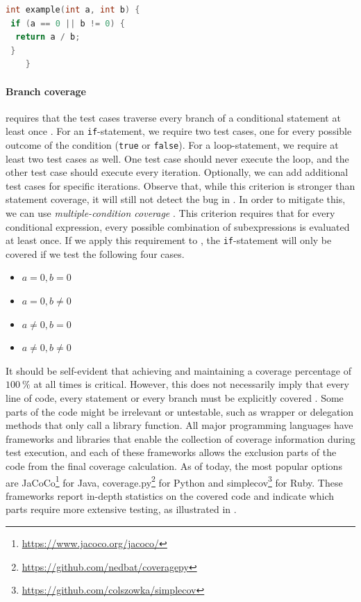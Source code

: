 \begin{lstlisting}[caption=Irrelevant statement coverage in C.,label=lst:statement-coverage-fail,language=C]
	int example(int a, int b) {
 if (a == 0 || b != 0) {
  return a / b;
 }
	}
\end{lstlisting}

\paragraph*{Branch coverage} requires that the test cases traverse every branch of a conditional statement at least once  \cite[p.~37]{Myers:2011:AST:2161638}. For an \texttt{if}-statement, we require two test cases, one for every possible outcome of the condition (\texttt{true} or \texttt{false}). For a loop-statement, we require at least two test cases as well. One test case should never execute the loop, and the other test case should execute every iteration. Optionally, we can add additional test cases for specific iterations. Observe that, while this criterion is stronger than statement coverage, it will still not detect the bug in . In order to mitigate this, we can use \emph{multiple-condition coverage} \cite[p.~40]{Myers:2011:AST:2161638}. This criterion requires that for every conditional expression, every possible combination of subexpressions is evaluated at least once. If we apply this requirement to , the \texttt{if}-statement will only be covered if we test the following four cases.

\begin{itemize}
	\item $a = 0, b = 0$
	\item $a = 0, b \neq 0$
	\item $a \neq 0, b = 0$
	\item $a \neq 0, b \neq 0$
\end{itemize}

\noindent It should be self-evident that achieving and maintaining a coverage percentage of $\SI{100}{\percent}$ at all times is critical. However, this does not necessarily imply that every line of code, every statement or every branch must be explicitly covered \cite{dein_2019}. Some parts of the code might be irrelevant or untestable, such as wrapper or delegation methods that only call a library function. All major programming languages have frameworks and libraries that enable the collection of coverage information during test execution, and each of these frameworks allows the exclusion parts of the code from the final coverage calculation. As of today, the most popular options are JaCoCo\footnote{\url{https://www.jacoco.org/jacoco/}} for Java, coverage.py\footnote{\url{https://github.com/nedbat/coveragepy}} for Python and simplecov\footnote{\url{https://github.com/colszowka/simplecov}} for Ruby. These frameworks report in-depth statistics on the covered code and indicate which parts require more extensive testing, as illustrated in .

